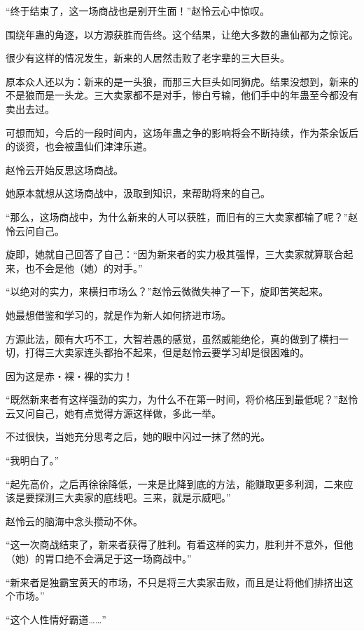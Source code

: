 
\begin{this_body}

“终于结束了，这一场商战也是别开生面！”赵怜云心中惊叹。

围绕年蛊的角逐，以方源获胜而告终。这个结果，让绝大多数的蛊仙都为之惊诧。

很少有这样的情况发生，新来的人居然击败了老字辈的三大巨头。

原本众人还以为：新来的是一头狼，而那三大巨头如同狮虎。结果没想到，新来的不是狼而是一头龙。三大卖家都不是对手，惨白亏输，他们手中的年蛊至今都没有卖出去过。

可想而知，今后的一段时间内，这场年蛊之争的影响将会不断持续，作为茶余饭后的谈资，也会被蛊仙们津津乐道。

赵怜云开始反思这场商战。

她原本就想从这场商战中，汲取到知识，来帮助将来的自己。

“那么，这场商战中，为什么新来的人可以获胜，而旧有的三大卖家都输了呢？”赵怜云问自己。

旋即，她就自己回答了自己：“因为新来者的实力极其强悍，三大卖家就算联合起来，也不会是他（她）的对手。”

“以绝对的实力，来横扫市场么？”赵怜云微微失神了一下，旋即苦笑起来。

她最想借鉴和学习的，就是作为新人如何挤进市场。

方源此法，颇有大巧不工，大智若愚的感觉，虽然威能绝伦，真的做到了横扫一切，打得三大卖家连头都抬不起来，但是赵怜云要学习却是很困难的。

因为这是赤・裸・裸的实力！

“既然新来者有这样强劲的实力，为什么不在第一时间，将价格压到最低呢？”赵怜云又问自己，她有点觉得方源这样做，多此一举。

不过很快，当她充分思考之后，她的眼中闪过一抹了然的光。

“我明白了。”

“起先高价，之后再徐徐降低，一来是比降到底的方法，能赚取更多利润，二来应该是要探测三大卖家的底线吧。三来，就是示威吧。”

赵怜云的脑海中念头攒动不休。

“这一次商战结束了，新来者获得了胜利。有着这样的实力，胜利并不意外，但他（她）的胃口绝不会满足于这一场商战中。”

“新来者是独霸宝黄天的市场，不只是将三大卖家击败，而且是让将他们排挤出这个市场。”

“这个人性情好霸道……”


\end{this_body}
